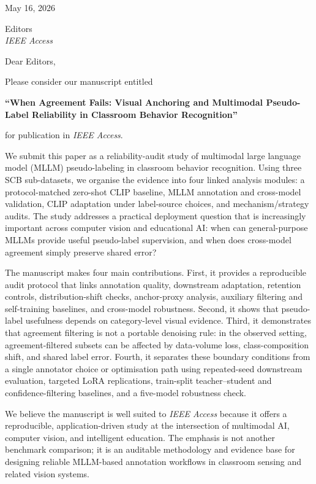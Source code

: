 \documentclass[11pt]{article}
\begin{document}
\begin{flushright}
May 16, 2026
\end{flushright}

Editors \\
\textit{IEEE Access}

Dear Editors,

Please consider our manuscript entitled

\textbf{``When Agreement Fails: Visual Anchoring and Multimodal Pseudo-Label Reliability in Classroom Behavior Recognition''}

for publication in \textit{IEEE Access}.

We submit this paper as a reliability-audit study of multimodal large
language model (MLLM) pseudo-labeling in classroom behavior recognition.
Using three SCB sub-datasets, we organise the evidence into four
linked analysis modules: a protocol-matched zero-shot CLIP baseline, MLLM
annotation and cross-model validation, CLIP adaptation under label-source
choices, and mechanism/strategy audits. The study addresses a practical
deployment question that is increasingly important across computer vision and
educational AI: when can general-purpose MLLMs provide useful pseudo-label
supervision, and when does cross-model agreement simply preserve shared error?

The manuscript makes four main contributions. First, it provides a
reproducible audit protocol that links annotation quality, downstream
adaptation, retention controls, distribution-shift checks, anchor-proxy
analysis, auxiliary filtering and self-training baselines, and cross-model
robustness. Second, it shows that pseudo-label usefulness depends on
category-level visual evidence. Third, it demonstrates that agreement
filtering is not a portable denoising rule: in the observed setting,
agreement-filtered subsets can be affected by data-volume loss,
class-composition shift, and shared label error. Fourth, it separates these
boundary conditions from a single annotator choice or optimisation path using
repeated-seed downstream evaluation, targeted LoRA replications, train-split
teacher--student and confidence-filtering baselines, and a five-model
robustness check.

We believe the manuscript is well suited to \textit{IEEE Access} because it
offers a reproducible, application-driven study at the intersection of
multimodal AI, computer vision, and intelligent education. The emphasis is not
another benchmark comparison; it is an auditable methodology and evidence base
for designing reliable MLLM-based annotation workflows in classroom sensing and
related vision systems.
\end{document}
